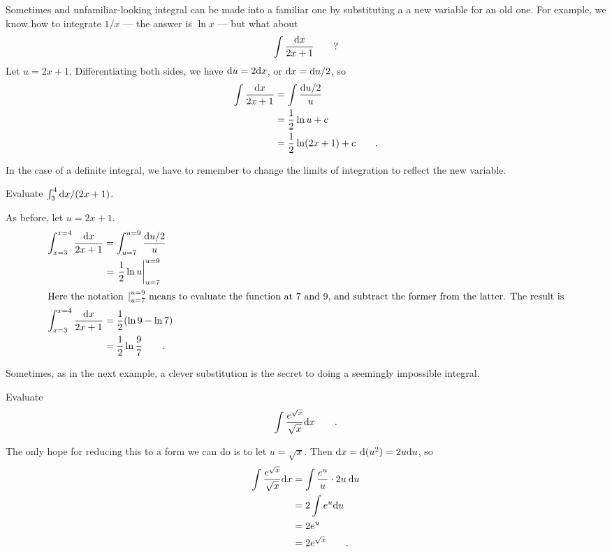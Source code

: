 Sometimes and unfamiliar-looking integral can be made into a familiar one by substituting a
a new variable for an old one. For example, we know how to integrate $1/x$ --- the answer
is $\ln x$ --- but what about
\begin{equation*}
  \int \frac{\textup{d} x}{2x+1}   \qquad ?
\end{equation*}
Let $u=2x+1$. Differentiating both sides, we have $\textup{d} u=2\textup{d} x$, or $\textup{d} x=\textup{d} u/2$, so
\begin{align*}
  \int \frac{\textup{d} x}{2x+1}   &= \int \frac{\textup{d} u/2}{u} \\
       &= \frac{1}{2}\ln u + c \\
       &= \frac{1}{2}\ln(2x+1) +c \qquad .
\end{align*}

In the case of a definite integral, we have to remember to change the limits of integration
to reflect the new variable.

\begin{eg}
\egquestion Evaluate $\int_3^4 \textup{d} x/(2x+1)$.

\eganswer As before, let $u=2x+1$.
\begin{align*}
  \int_{x=3}^{x=4} \frac{\textup{d} x}{2x+1}   &= \int_{u=7}^{u=9} \frac{\textup{d} u/2}{u} \\
       &= \left.\frac{1}{2}\ln u\right|_{u=7}^{u=9} \\
\intertext{Here the notation $\left.\right|_{u=7}^{u=9}$ means to evaluate the function at
7 and 9, and subtract the former from the latter. The result is}
  \int_{x=3}^{x=4} \frac{\textup{d} x}{2x+1}  &= \frac{1}{2}(\ln 9-\ln 7) \\
            &=\frac{1}{2}\ln\frac{9}{7} \qquad .
\end{align*}
\end{eg}

Sometimes, as in the next example, a clever substitution is the secret to doing a
seemingly impossible integral.

\begin{eg}\label{eg:not-so-tricky}
\egquestion Evaluate
\begin{equation*}
  \int \frac{e^{\sqrt x}}{\sqrt x} \textup{d} x \qquad .
\end{equation*}

\eganswer The only hope for reducing this to a form we can do is to let
$u=\sqrt x$. Then $\textup{d} x=\textup{d}(u^2)=2u\textup{d} u$, so
\begin{align*}
  \int \frac{e^{\sqrt x}}{\sqrt x} \textup{d} x &=   \int \frac{e^u}{u} \cdot 2u\:\textup{d} u \\
             &= 2 \int e^u \textup{d} u \\
             &= 2e^u \\
             &= 2e^{\sqrt{x}} \qquad .
\end{align*}
\end{eg}

